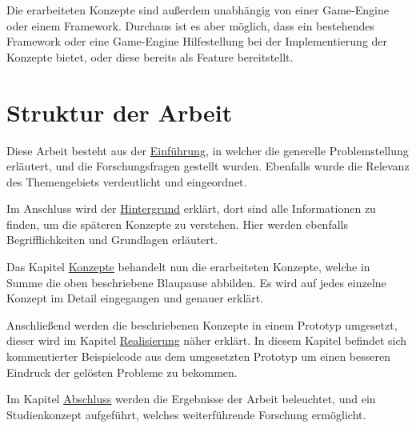 Die erarbeiteten Konzepte sind außerdem unabhängig von einer Game-Engine oder einem Framework. Durchaus ist es aber möglich, dass ein bestehendes Framework oder eine Game-Engine Hilfestellung bei der Implementierung der Konzepte bietet, oder diese bereits als Feature bereitstellt.

\section{Struktur der Arbeit}

Diese Arbeit besteht aus der \hyperref[sec:einfuehrung]{Einführung}, in welcher die generelle Problemstellung erläutert, und die Forschungsfragen gestellt wurden. Ebenfalls wurde die Relevanz des Themengebiets verdeutlicht und eingeordnet.

Im Anschluss wird der  \hyperref[sec:hintergrund]{Hintergrund} erklärt, dort sind alle Informationen zu finden, um die späteren Konzepte zu verstehen. Hier werden ebenfalls Begrifflichkeiten und Grundlagen erläutert.

Das Kapitel \hyperref[sec:konzepte]{Konzepte} behandelt nun die erarbeiteten Konzepte, welche in Summe die oben beschriebene Blaupause abbilden. Es wird auf jedes einzelne Konzept im Detail eingegangen und genauer erklärt. 
 
Anschließend werden die beschriebenen Konzepte in einem Prototyp umgesetzt, dieser wird im Kapitel \hyperref[sec:realisierung]{Realisierung} näher erklärt. In diesem Kapitel befindet sich kommentierter Beispielcode aus dem umgesetzten Prototyp um einen besseren Eindruck der gelösten Probleme zu bekommen.

Im Kapitel \hyperref[sec:zusammenfassung]{Abschluss} werden die Ergebnisse der Arbeit beleuchtet, und ein Studienkonzept aufgeführt, welches weiterführende Forschung ermöglicht.
